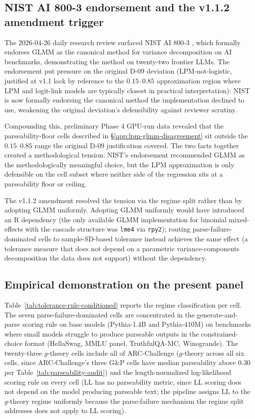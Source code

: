 \documentclass[11pt]{article}
\begin{document}
\subsection{NIST AI 800-3 endorsement and the v1.1.2 amendment trigger}
\label{app:lpm-glmm-nist}

The 2026-04-26 daily research review surfaced NIST AI 800-3 \citep{nist2026statmodels}, which formally endorses GLMM as the canonical method for variance decomposition on AI benchmarks, demonstrating the method on twenty-two frontier LLMs. The endorsement put pressure on the original D-09 deviation (LPM-not-logistic, justified at v1.1 lock by reference to the $0.15$--$0.85$ approximation region where LPM and logit-link models are typically closest in practical interpretation): NIST is now formally endorsing the canonical method the implementation declined to use, weakening the original deviation's defensibility against reviewer scrutiny.

Compounding this, preliminary Phase 4 GPU-run data revealed that the parseability-floor cells described in §\ref{app:lpm-glmm-disagreement} sit outside the $0.15$--$0.85$ range the original D-09 justification covered. The two facts together created a methodological tension: NIST's endorsement recommended GLMM as the methodologically meaningful choice, but the LPM approximation is only defensible on the cell subset where neither side of the regression sits at a parseability floor or ceiling.

The v1.1.2 amendment resolved the tension via the regime split rather than by adopting GLMM uniformly. Adopting GLMM uniformly would have introduced an R dependency (the only available GLMM implementation for binomial mixed-effects with the cascade structure was \texttt{lme4} via \texttt{rpy2}); routing parse-failure-dominated cells to sample-SD-based tolerance instead achieves the same effect (a tolerance measure that does not depend on a parametric variance-components decomposition the data does not support) without the dependency.

\subsection{Empirical demonstration on the present panel}
\label{app:lpm-glmm-empirical}

Table~\ref{tab:tolerance-rule-conditioned} reports the regime classification per cell. The seven parse-failure-dominated cells are concentrated in the generate-and-parse scoring rule on base models (Pythia-1.4B and Pythia-410M) on benchmarks where small models struggle to produce parseable outputs in the constrained-choice format (HellaSwag, MMLU panel, TruthfulQA-MC, Winogrande). The twenty-three $g$-theory cells include all of ARC-Challenge ($g$-theory across all six cells, since ARC-Challenge's three G\&P cells have median parseability above 0.30 per Table~\ref{tab:parseability-audit}) and the length-normalized log-likelihood scoring rule on every cell (LL has no parseability metric, since LL scoring does not depend on the model producing parseable text; the pipeline assigns LL to the $g$-theory regime uniformly because the parse-failure mechanism the regime split addresses does not apply to LL scoring).
\end{document}
